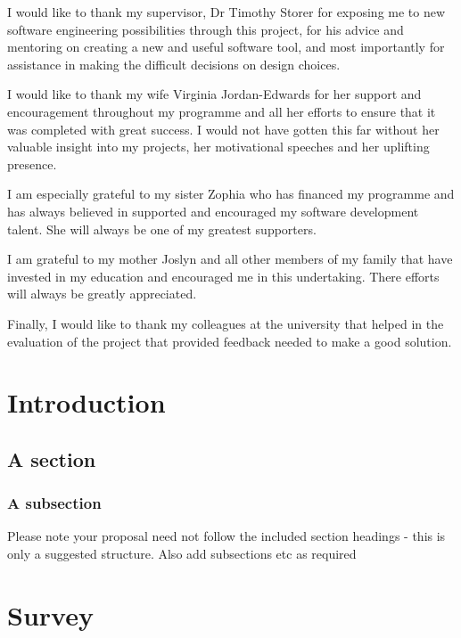 \documentclass{mproj}
\begin{document}
I would like to thank my supervisor, Dr Timothy Storer for exposing me to new software engineering possibilities through this project, for his advice and mentoring on creating a new and useful software tool, and most importantly for assistance in making the difficult decisions on design choices.

I would like to thank my wife Virginia Jordan-Edwards for her support and encouragement throughout my programme and all her efforts to ensure that it was completed with great success. I would not have gotten this far without her valuable insight into my projects, her motivational speeches and her uplifting presence.

I am especially grateful to my sister Zophia who has financed my programme and has always believed in supported and encouraged my software development talent. She will always be one of my greatest supporters.

I am grateful to my mother Joslyn and all other members of my family that have invested in my education and encouraged me in this undertaking. There efforts will always be greatly appreciated.

Finally, I would like to thank my colleagues at the university that helped in the evaluation of the project that provided feedback needed to make a good solution.

\tableofcontents

\chapter{Introduction}\label{intro}

\section{A section}
\subsection{A subsection}
Please note your proposal need not follow the included section headings - this is only a suggested structure. Also add subsections etc as required

\chapter{Survey}\label{survey}
\end{document}
